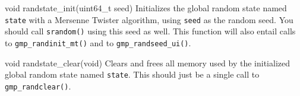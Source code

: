 \begin{funcdoc}{void randstate\_init(uint64\_t seed)}
  Initializes the global random state named \texttt{state} with a Mersenne
  Twister algorithm, using \texttt{seed} as the random seed. You should call
  \texttt{srandom()} using this seed as well. This function will also entail
  calls to \texttt{gmp\_randinit\_mt()} and to \texttt{gmp\_randseed\_ui()}.
\end{funcdoc}

\begin{funcdoc}{void randstate\_clear(void)}
  Clears and frees all memory used by the initialized global random
  state named \texttt{state}. This should just be a single call to
  \texttt{gmp\_randclear()}.
\end{funcdoc}
